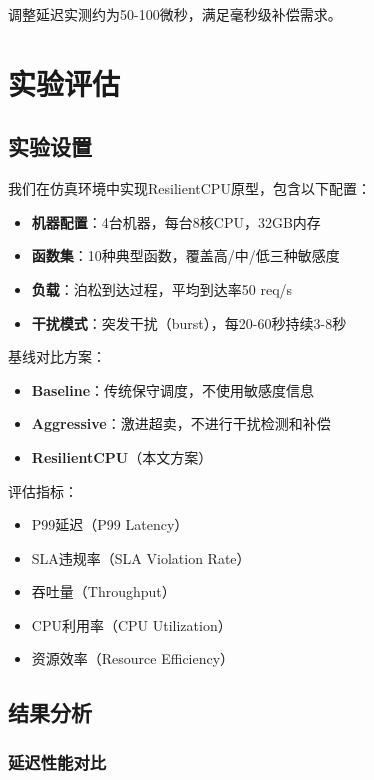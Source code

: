 \documentclass[11pt, a4paper, oneside]{article}
\begin{document}
调整延迟实测约为50-100微秒，满足毫秒级补偿需求。

\section{实验评估}

\subsection{实验设置}

我们在仿真环境中实现ResilientCPU原型，包含以下配置：

\begin{itemize}
    \item \textbf{机器配置}：4台机器，每台8核CPU，32GB内存
    \item \textbf{函数集}：10种典型函数，覆盖高/中/低三种敏感度
    \item \textbf{负载}：泊松到达过程，平均到达率50 req/s
    \item \textbf{干扰模式}：突发干扰（burst），每20-60秒持续3-8秒
\end{itemize}

基线对比方案：
\begin{itemize}
    \item \textbf{Baseline}：传统保守调度，不使用敏感度信息
    \item \textbf{Aggressive}：激进超卖，不进行干扰检测和补偿
    \item \textbf{ResilientCPU}（本文方案）
\end{itemize}

评估指标：
\begin{itemize}
    \item P99延迟（P99 Latency）
    \item SLA违规率（SLA Violation Rate）
    \item 吞吐量（Throughput）
    \item CPU利用率（CPU Utilization）
    \item 资源效率（Resource Efficiency）
\end{itemize}

\subsection{结果分析}

\subsubsection{延迟性能对比}
\end{document}
